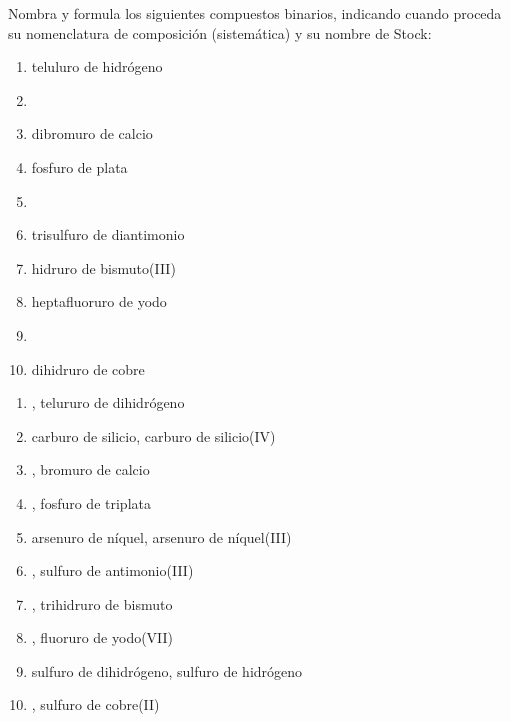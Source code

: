 \documentclass[10pt,a5paper,twoside]{article}
\begin{document}
\begin{exercise}[
    tags    = {inorgánica,compuestos binarios,sales binarias,sales},
    topics  = {química inorgánica,formulación,nomenclatura},
    source  = {SAN Formulación, p26, e30},
  ]
  Nombra y formula los siguientes compuestos binarios, indicando cuando proceda su nomenclatura de composición (sistemática) y su nombre de Stock:

  \begin{enumerate}
    \item teluluro de hidrógeno
    \item {}
    \item dibromuro de calcio
    \item fosfuro de plata
    \item {}
    \item trisulfuro de diantimonio
    \item hidruro de bismuto(III)
    \item heptafluoruro de yodo
    \item {}
    \item dihidruro de cobre
  \end{enumerate}
\end{exercise}

\begin{solution}
  \begin{enumerate}
    \item {}, telururo de dihidrógeno
    \item carburo de silicio, carburo de silicio(IV)
    \item {}, bromuro de calcio
    \item {}, fosfuro de triplata
    \item arsenuro de níquel, arsenuro de níquel(III)
    \item {}, sulfuro de antimonio(III)
    \item {}, trihidruro de bismuto
    \item {}, fluoruro de yodo(VII)
    \item sulfuro de dihidrógeno, sulfuro de hidrógeno
    \item {}, sulfuro de cobre(II)
  \end{enumerate}
\end{solution}
\end{document}
